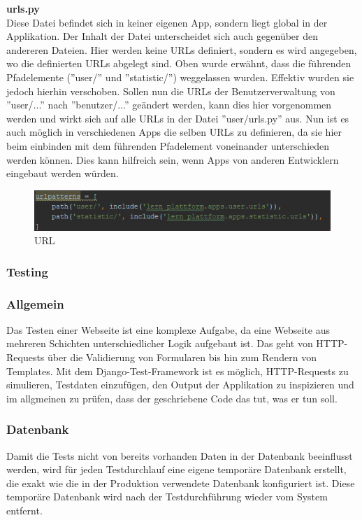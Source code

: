 \textbf{urls.py} \\
Diese Datei befindet sich in keiner eigenen App, sondern liegt global in der Applikation. Der Inhalt der Datei unterscheidet sich auch gegenüber den andereren Dateien. Hier werden keine URLs definiert, sondern es wird angegeben, wo die definierten URLs abgelegt sind. Oben wurde erwähnt, dass die führenden Pfadelemente (''user/'' und ''statistic/'') weggelassen wurden. Effektiv wurden sie jedoch hierhin verschoben. Sollen nun die URLs der Benutzerverwaltung von ''user/...'' nach ''benutzer/...'' geändert werden, kann dies hier vorgenommen werden und wirkt sich auf alle URLs in der Datei ''user/urls.py'' aus. Nun ist es auch möglich in verschiedenen Apps die selben URLs zu definieren, da sie hier beim einbinden mit dem führenden Pfadelement voneinander unterschieden werden können. Dies kann hilfreich sein, wenn Apps von anderen Entwicklern eingebaut werden würden. \\
\begin{minipage}{\textwidth}
	\begin{figure}[H]
		\includegraphics[width=\textwidth, height=\textheight, keepaspectratio]{images/URLglobal.png}
		\caption{URL}
	\end{figure}
\end{minipage}




\subsubsection{Testing}

\subsubsection*{Allgemein}
Das Testen einer Webseite ist eine komplexe Aufgabe, da eine Webseite aus mehreren Schichten unterschiedlicher Logik aufgebaut ist. Das geht von HTTP-Requests über die Validierung von Formularen bis hin zum Rendern von Templates. Mit dem Django-Test-Framework ist es möglich, HTTP-Requests zu simulieren, Testdaten einzufügen, den Output der Applikation zu inspizieren und im allgmeinen zu prüfen, dass der geschriebene Code das tut, was er tun soll.

\subsubsection*{Datenbank}
Damit die Tests nicht von bereits vorhanden Daten in der Datenbank beeinflusst werden, wird für jeden Testdurchlauf eine eigene temporäre Datenbank erstellt, die exakt wie die in der Produktion verwendete Datenbank konfiguriert ist. Diese temporäre Datenbank wird nach der Testdurchführung wieder vom System entfernt.

